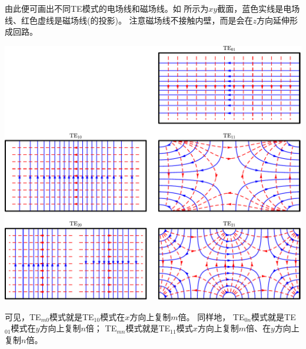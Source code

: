 由此便可画出不同TE模式的电场线和磁场线。如 所示为$xy$截面，蓝色实线是电场线、红色虚线是磁场线(的投影)。
注意磁场线不接触内壁，而是会在$z$方向延伸形成回路。
\begin{center}
    \includegraphics[width=0.8\linewidth]{figures/waveguide_rect_TE.pdf}
    \label{fig:waveguide rect TE}
\end{center}
可见，TE$_{m0}$模式就是TE$_{10}$模式在$x$方向上复制$m$倍。
同样地，
TE$_{0n}$模式就是TE$_{01}$模式在$y$方向上复制$n$倍；
TE$_{mn}$模式就是TE$_{11}$模式$x$方向上复制$m$倍、在$y$方向上复制$n$倍。

